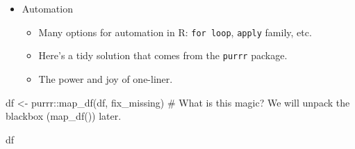 \documentclass[
  letterpaper,
  DIV=11,
  numbers=noendperiod]{scrreprt}
\newenvironment{Shaded}{\begin{snugshade}}{\end{snugshade}}
\newcommand{\CommentTok}[1]{\textcolor[rgb]{0.37,0.37,0.37}{#1}}
\newcommand{\ConstantTok}[1]{\textcolor[rgb]{0.56,0.35,0.01}{#1}}
\newcommand{\ControlFlowTok}[1]{\textcolor[rgb]{0.00,0.23,0.31}{#1}}
\newcommand{\DecValTok}[1]{\textcolor[rgb]{0.68,0.00,0.00}{#1}}
\newcommand{\FunctionTok}[1]{\textcolor[rgb]{0.28,0.35,0.67}{#1}}
\newcommand{\NormalTok}[1]{\textcolor[rgb]{0.00,0.23,0.31}{#1}}
\newcommand{\OtherTok}[1]{\textcolor[rgb]{0.00,0.23,0.31}{#1}}
\newcommand{\SpecialCharTok}[1]{\textcolor[rgb]{0.37,0.37,0.37}{#1}}
\providecommand{\tightlist}{%
  \setlength{\itemsep}{0pt}\setlength{\parskip}{0pt}}\usepackage{longtable,booktabs,array}
\begin{document}
\begin{Shaded}
\end{Shaded}

\begin{itemize}
\tightlist
\item
  Automation

  \begin{itemize}
  \tightlist
  \item
    Many options for automation in R: \texttt{for\ loop}, \texttt{apply}
    family, etc.
  \item
    Here's a tidy solution that comes from the \texttt{purrr} package.
  \item
    The power and joy of one-liner.
  \end{itemize}
\end{itemize}

\begin{Shaded}
\begin{Highlighting}[]
\NormalTok{df }\OtherTok{\textless{}{-}}\NormalTok{ purrr}\SpecialCharTok{::}\FunctionTok{map\_df}\NormalTok{(df, fix\_missing) }\CommentTok{\# What is this magic? We will unpack the blackbox (\textasciigrave{}map\_df()\textasciigrave{}) later.}

\NormalTok{df}
\end{Highlighting}
\end{Shaded}
\end{document}
